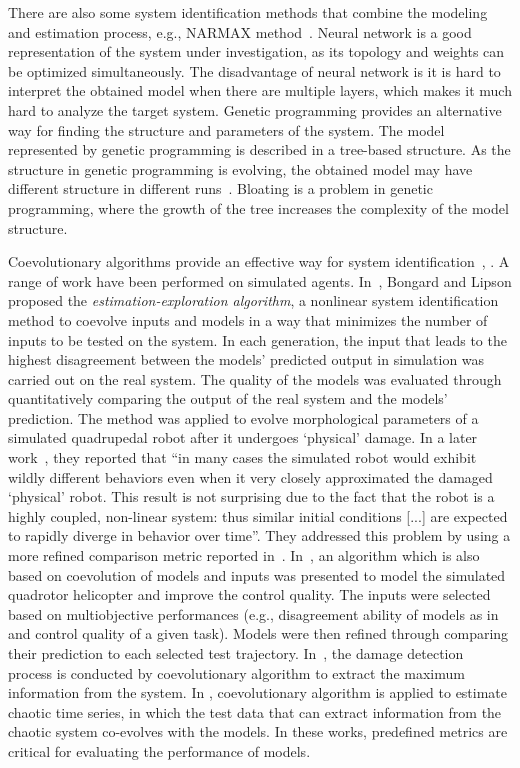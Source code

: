 There are also some system identification methods that combine the modeling and estimation process, e.g., NARMAX method~\cite{Billings2013}. Neural network is a good representation of the system under investigation, as its topology and weights can be optimized simultaneously. The disadvantage of neural network is it is hard to interpret the obtained model when there are multiple layers, which makes it much hard to analyze the target system. Genetic programming provides an alternative way for finding the structure and parameters of the system. The model represented by genetic programming is described in a tree-based structure. As the structure in genetic programming is evolving, the obtained model may have different structure in different runs~\cite{Vladislavleva:2009}. Bloating is a problem in genetic programming, where the growth of the tree increases the complexity of the model structure. 

Coevolutionary algorithms provide an effective way for system identification~\cite{Bongard2005}, \cite{Bongard_remote_robot_2004,Bongard_function_recovery_2004,Koos2009,Bongard2007PNAS,Mirm2011,Ly2014}. A range of work have been performed on simulated agents. In~\cite{Bongard_remote_robot_2004}, Bongard and Lipson proposed the \emph{estimation-exploration algorithm}, a nonlinear system identification method to coevolve inputs and models in a way that minimizes the number of inputs to be tested on the system. In each generation, the input that leads to the highest disagreement between the models' predicted output in simulation was carried out on the real system. The quality of the models was evaluated through quantitatively comparing the output of the real system and the models' prediction. The method was applied to evolve morphological parameters of a simulated quadrupedal robot after it undergoes `physical' damage. In a later work~\cite{Bongard_function_recovery_2004}, they reported that ``in many cases the simulated robot would exhibit wildly different behaviors even when it very closely approximated the damaged `physical' robot. This result is not surprising due to the fact that the robot is a highly coupled, non-linear system: thus similar initial conditions [...] are expected to rapidly diverge in behavior over time''. They addressed this problem by using a more refined comparison metric reported in~\cite{Bongard_function_recovery_2004}. In~\cite{Koos2009}, an algorithm which is also based on coevolution of models and inputs was presented to model the simulated quadrotor helicopter and improve the control quality. The inputs were selected based on multiobjective performances (e.g., disagreement ability of models as in ~\cite{Bongard_remote_robot_2004} and control quality of a given task). Models were then refined through comparing their prediction to each selected test trajectory. In~\cite{Kouchmeshky_2007}, the damage detection process is conducted by coevolutionary algorithm to extract the maximum information from the system. In \cite{Mirmomeni_2011}, coevolutionary algorithm is applied to estimate chaotic time series, in which the test data that can extract information from the chaotic system co-evolves with the models. In these works, predefined metrics are critical for evaluating the performance of models. 
  
